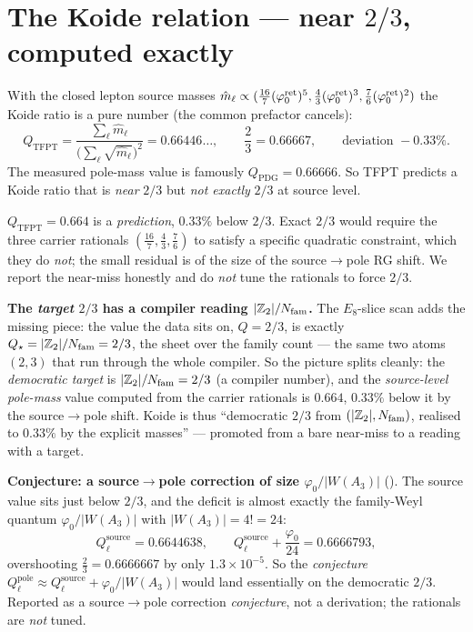 \section{The Koide relation --- near $2/3$, computed exactly}
With the closed lepton source masses $\hat m_\ell\propto(\tfrac{16}{7}(\varphi_0^{\mathrm{ret}})^5,\tfrac43(\varphi_0^{\mathrm{ret}})^3,\tfrac76(\varphi_0^{\mathrm{ret}})^2)$
the Koide ratio is a pure number (the common prefactor cancels):
\[
  Q_{\mathrm{TFPT}}=\frac{\sum_\ell \hat m_\ell}{\bigl(\sum_\ell\sqrt{\hat m_\ell}\bigr)^2}
  =0.66446\ldots,\qquad \frac23=0.66667,\qquad \text{deviation }-0.33\% .
\]
The measured pole-mass value is famously $Q_{\mathrm{PDG}}=0.66666$. So TFPT predicts a Koide ratio that
is \emph{near} $2/3$ but \emph{not exactly} $2/3$ at source level.

\begin{keybox}
$Q_{\mathrm{TFPT}}=0.664$ is a \emph{prediction}, $0.33\%$ below $2/3$. Exact $2/3$ would require the
three carrier rationals $(\tfrac{16}{7},\tfrac43,\tfrac76)$ to satisfy a specific quadratic constraint,
which they do \emph{not}; the small residual is of the size of the source$\to$pole RG shift. We report
the near-miss honestly and do \emph{not} tune the rationals to force $2/3$.
\end{keybox}

\par\smallskip\noindent\textbf{The \emph{target} $2/3$ has a compiler reading $|\mathbb{Z}_2|/N_{\mathrm{fam}}$.}
The $E_8$-slice scan adds the missing piece: the value the data sits on, $Q=2/3$, is exactly
$Q_\star=|\mathbb{Z}_2|/N_{\mathrm{fam}}=2/3$,
the sheet over the family count --- the same two atoms $(2,3)$ that run through the whole compiler. So
the picture splits cleanly: the \emph{democratic target} is $|\mathbb{Z}_2|/N_{\mathrm{fam}}=2/3$ (a compiler number), and
the \emph{source-level pole-mass} value computed from the carrier rationals is $0.664$, $0.33\%$ below it
by the source$\to$pole shift. Koide is thus ``democratic $2/3$ from $(|\mathbb{Z}_2|,N_{\mathrm{fam}})$, realised to
$0.33\%$ by the explicit masses'' --- promoted from a bare near-miss to a reading with a target. \mC

\par\smallskip\noindent\textbf{Conjecture: a source$\to$pole correction of size $\varphi_0/|W(A_3)|$} (\mC).
The source value sits just below $2/3$, and the deficit is almost exactly the family-Weyl quantum
$\varphi_0/|W(A_3)|$ with $|W(A_3)|=4!=24$:
\[
  Q_\ell^{\mathrm{source}}=0.6644638,\qquad
  Q_\ell^{\mathrm{source}}+\frac{\varphi_0}{24}=0.6666793,
\]
overshooting $\tfrac23=0.6666667$ by only $1.3\times10^{-5}$. So the \emph{conjecture}
$Q_\ell^{\mathrm{pole}}\approx Q_\ell^{\mathrm{source}}+\varphi_0/|W(A_3)|$ would land essentially on the
democratic $2/3$. Reported as a source$\to$pole correction \emph{conjecture}, not a derivation; the
rationals are \emph{not} tuned. 

